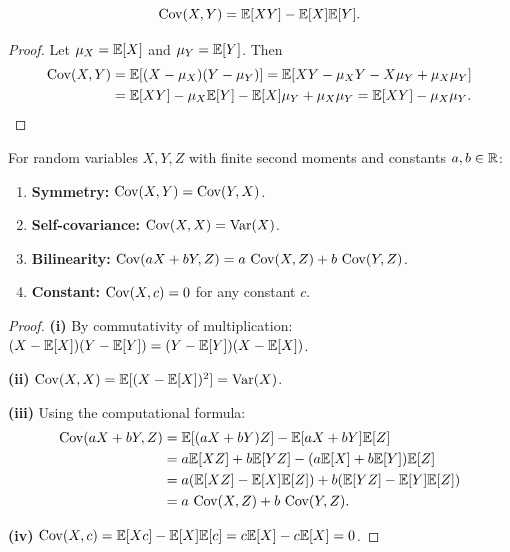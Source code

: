 \documentclass[11pt,a4paper]{article}
\begin{document}
\begin{proposition}
\label{prop:cov_formula}
\[
    \operatorname{Cov}(X, Y) = \mathbb{E}[XY] - \mathbb{E}[X]\mathbb{E}[Y].
\]
\end{proposition}

\begin{proof}
Let $\mu_X = \mathbb{E}[X]$ and $\mu_Y = \mathbb{E}[Y]$. Then
\begin{align*}
    \operatorname{Cov}(X,Y) &= \mathbb{E}[(X - \mu_X)(Y - \mu_Y)]
    = \mathbb{E}[XY - \mu_X Y - X \mu_Y + \mu_X \mu_Y] \\
    &= \mathbb{E}[XY] - \mu_X \mathbb{E}[Y] - \mathbb{E}[X] \mu_Y + \mu_X \mu_Y
    = \mathbb{E}[XY] - \mu_X \mu_Y. \qedhere
\end{align*}
\end{proof}

\begin{proposition}
\label{prop:cov_properties}
For random variables $X, Y, Z$ with finite second moments and constants
$a, b \in \mathbb{R}$:
\begin{enumerate}[nosep,label=(\roman*)]
    \item \textbf{Symmetry:} $\operatorname{Cov}(X, Y) = \operatorname{Cov}(Y, X)$.
    \item \textbf{Self-covariance:} $\operatorname{Cov}(X, X) = \operatorname{Var}(X)$.
    \item \textbf{Bilinearity:}
    $\operatorname{Cov}(aX + bY, Z) = a\,\operatorname{Cov}(X, Z) + b\,\operatorname{Cov}(Y, Z)$.
    \item \textbf{Constant:} $\operatorname{Cov}(X, c) = 0$ for any constant $c$.
\end{enumerate}
\end{proposition}

\begin{proof}
\textbf{(i)} By commutativity of multiplication:
$(X - \mathbb{E}[X])(Y - \mathbb{E}[Y]) = (Y - \mathbb{E}[Y])(X - \mathbb{E}[X])$.

\textbf{(ii)} $\operatorname{Cov}(X, X) = \mathbb{E}[(X - \mathbb{E}[X])^2] = \operatorname{Var}(X)$.

\textbf{(iii)} Using the computational formula:
\begin{align*}
    \operatorname{Cov}(aX + bY, Z)
    &= \mathbb{E}[(aX + bY)Z] - \mathbb{E}[aX + bY]\mathbb{E}[Z] \\
    &= a\mathbb{E}[XZ] + b\mathbb{E}[YZ] - (a\mathbb{E}[X] + b\mathbb{E}[Y])\mathbb{E}[Z] \\
    &= a(\mathbb{E}[XZ] - \mathbb{E}[X]\mathbb{E}[Z]) + b(\mathbb{E}[YZ] - \mathbb{E}[Y]\mathbb{E}[Z]) \\
    &= a\,\operatorname{Cov}(X,Z) + b\,\operatorname{Cov}(Y,Z).
\end{align*}

\textbf{(iv)} $\operatorname{Cov}(X, c) = \mathbb{E}[Xc] - \mathbb{E}[X]\mathbb{E}[c]
= c\mathbb{E}[X] - c\mathbb{E}[X] = 0$.
\end{proof}
\end{document}
